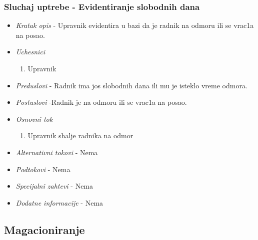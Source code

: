 \documentclass[10 pt]{article}
\begin{document}
	\subsubsection{Sluchaj uptrebe - Evidentiranje slobodnih dana}
	\begin{itemize}
		
		\item \textit{Kratak opis} - Upravnik evidentira u bazi da je radnik na odmoru ili se vrac1a na posao.
		
		\item \textit{Uchesnici}
		\begin{enumerate}
			\item Upravnik
		\end{enumerate}
		
		\item \textit{Preduslovi} - Radnik ima jos slobodnih dana ili mu je isteklo vreme odmora.
		
		\item \textit{Postuslovi} -Radnik je na odmoru ili se vrac1a na posao.
		
		\item \textit{Osnovni tok}
		\begin{enumerate}
			\item Upravnik shalje radnika na odmor
		\end{enumerate}
		
		\item \textit{Alternativni tokovi} - Nema
		
		\item \textit{Podtokovi} - Nema
		
		\item \textit{Specijalni zahtevi} - Nema
		
		\item \textit{Dodatne informacije} - Nema
		
	\end{itemize}
		

	\subsection{Magacioniranje}
\end{document}
